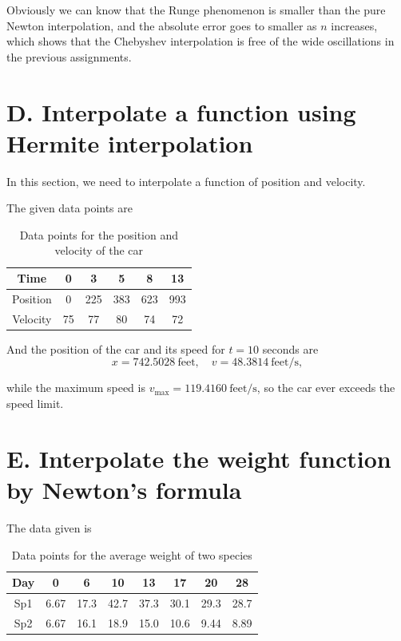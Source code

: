 \documentclass[a4paper]{article}
\renewcommand\arraystretch{1.8}
\begin{document}
Obviously we can know that the Runge phenomenon is smaller than the pure Newton interpolation, and the absolute error goes to smaller as $n$ increases, which shows that the Chebyshev interpolation is free of the wide oscillations in the previous assignments.

\section*{D. Interpolate a function using Hermite interpolation}

In this section, we need to interpolate a function of position and velocity.

The given data points are
\begin{table}[htbp]
    \centering 
    \renewcommand{\arraystretch}{0.95}
    \begin{tabular}{|c|c|c|c|c|c|}
        \hline 
        Time & 0 & 3 & 5 & 8 & 13 \\
        \hline
        Position & 0 & 225 & 383 & 623 & 993 \\
        \hline
        Velocity & 75 & 77 & 80 & 74 & 72 \\
        \hline
    \end{tabular}
    \caption{Data points for the position and velocity of the car}
    \label{tab:D.data}
    \renewcommand{\arraystretch}{1.0}
\end{table}

And the position of the car and its speed for $t = 10$ seconds are
\begin{equation}
    x = 742.5028\ \mathrm{feet}, \quad v = 48.3814\ \mathrm{feet/s},
    \label{eq:D.hermite}
\end{equation}

while the maximum speed is $v_{\mathrm{max}} = 119.4160\ \mathrm{feet/s}$, so the car ever exceeds the speed limit.

\section*{E. Interpolate the weight function by Newton's formula}

The data given is 
\begin{table}[htbp]
    \centering
    \renewcommand{\arraystretch}{0.95}
    \begin{tabular}{|c|c|c|c|c|c|c|c|}
        \hline
        Day & 0 & 6 & 10 & 13 & 17 & 20 & 28 \\
        \hline
        Sp1 & 6.67 & 17.3 & 42.7 & 37.3 & 30.1 & 29.3 & 28.7 \\
        \hline 
        Sp2 & 6.67 & 16.1 & 18.9 & 15.0 & 10.6 & 9.44 & 8.89 \\
        \hline        
    \end{tabular}
    \caption{Data points for the average weight of two species}
    \label{tab:E.data}
    \renewcommand{\arraystretch}{1.0}
\end{table}
\end{document}
